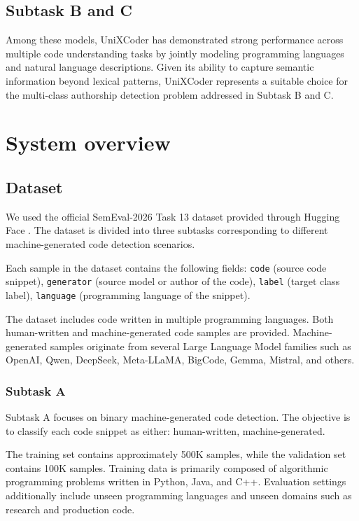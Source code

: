 \documentclass[11pt]{article}
\begin{document}
\subsection{ Subtask B and C}

Among these models, UniXCoder \cite{guo2022unixcoderunifiedcrossmodalpretraining} has demonstrated strong performance across multiple code understanding tasks by jointly modeling programming languages and natural language descriptions. Given its ability to capture semantic information beyond lexical patterns, UniXCoder represents a suitable choice for the multi-class authorship detection problem addressed in Subtask B and C.

\section{System overview}
\subsection{Dataset}

We used the official SemEval-2026 Task 13 dataset provided through Hugging Face \cite{orel-etal-2025-codet, orel2025textttdroidresourcesuiteaigenerated}. The dataset is divided into three subtasks corresponding to different machine-generated code detection scenarios.

Each sample in the dataset contains the following fields: \texttt{code} (source code snippet), \texttt{generator} (source model or author of the code), \texttt{label} (target class label), \texttt{language} (programming language of the snippet).

The dataset includes code written in multiple programming languages. Both human-written and machine-generated code samples are provided. Machine-generated samples originate from several Large Language Model families such as OpenAI, Qwen, DeepSeek, Meta-LLaMA, BigCode, Gemma, Mistral, and others.

\subsubsection{ Subtask A}

Subtask A focuses on binary machine-generated code detection. The objective is to classify each code snippet as either: human-written, machine-generated.

The training set contains approximately 500K samples, while the validation set contains 100K samples. Training data is primarily composed of algorithmic programming problems written in Python, Java, and C++. Evaluation settings additionally include unseen programming languages and unseen domains such as research and production code.
\end{document}
